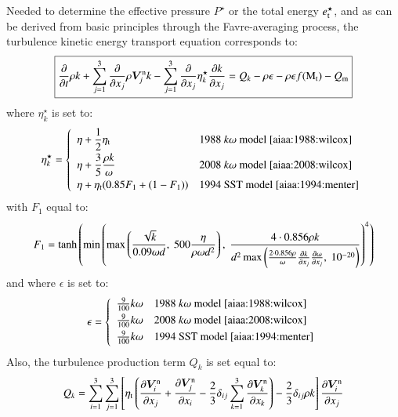 \documentclass{warpdoc}
\newcommand\frameeqn[1]{\fbox{$\displaystyle #1$}}
\newcommand{\alb}{\vspace{0.1cm}\\} %
\newcommand{\mfd}{\displaystyle}
\newcommand{\visc}{\eta}
\renewcommand{\vec}[1]{\bm{#1}}
\begin{document}
Needed to determine the effective pressure $P^\star$ or the total energy $e_{\rm t}^\star$, and as can be derived from basic principles through the Favre-averaging process, the turbulence kinetic energy transport equation corresponds to:
%
\begin{equation}
\frameeqn{
    \frac{\partial }{\partial t} \rho k
  + \sum_{j=1}^{3}\frac{\partial }{\partial x_j} \rho \vec{V}^{\rm n}_j k
  - \sum_{j=1}^{3} \frac{\partial }{\partial x_j}
     \visc_k^\star \frac{\partial k}{\partial x_j}
  =
  Q_k-\rho \epsilon -\rho\epsilon f({\rm M}_{\rm t})-Q_{\rm m}
}
\label{eqn:k}
\end{equation}
%
where $\visc_k^\star$ is set to:
%
\begin{equation}
\visc_k^\star = \left\{\begin{array}{ll}\mfd\visc  + \frac{1}{2}\visc_{\rm t} & \textrm{1988~$k\omega$~model \cite{aiaa:1988:wilcox}} \alb
                                      \mfd \visc  +  \frac{3}{5} \frac{\rho k}{\omega} & \textrm{2008~$k\omega$~model \cite{aiaa:2008:wilcox}}  \alb
                                      \mfd \visc + \visc_{\rm t} (0.85 F_1+(1-F_1))  & \textrm{1994 SST model \cite{aiaa:1994:menter}}
                                      \end{array} \right.
\end{equation}
%
with $F_1$ equal to:
%
\begin{equation}
F_1= {\rm tanh} \left(
  \min \left(
  \max \left(
  \frac{\sqrt{k}}{0.09 \omega d}, ~500 \frac{\visc}{\rho \omega  d^2}
   \right),~
   \frac{4\cdot 0.856 \rho k}{d^2 \max\left(\frac{2\cdot 0.856 \rho }{\omega} \frac{\partial k}{\partial x_j}\frac{\partial \omega}{\partial x_j}  ,~10^{-20} \right)}
   \right)^4
   \right)
\end{equation}
%
and where $\epsilon$ is set to:
%
\begin{equation}
\epsilon= \left\{\begin{array}{ll}
                    \frac{9}{100} k\omega & \textrm{1988~$k\omega$~model \cite{aiaa:1988:wilcox}} \alb
                    \frac{9}{100} k \omega & \textrm{2008~$k\omega$~model \cite{aiaa:2008:wilcox}} \alb
                    \frac{9}{100} k \omega & \textrm{1994 SST model \cite{aiaa:1994:menter}} \alb
                 \end{array} \right.
\end{equation}
%
Also, the turbulence production term $Q_k$ is set equal to:
%
\begin{equation}
  Q_k= \mfd\sum_{i=1}^3 \sum_{j=1}^{3}
         \left[ \visc_{\rm t} \left(
           \frac{\partial {\vec{V}^{\rm n}_i}}{\partial x_j}
           +\frac{\partial {\vec{V}^{\rm n}_j}}{\partial x_i}
           -\frac{2}{3} \delta_{ij} \sum_{k=1}^3 \frac{\partial {\vec{V}^{\rm n}_k}}{\partial x_k}
            \right)
           - \frac{2}{3} \delta_{ij} {\rho} k
         \right]
         \frac{\partial {\vec{V}^{\rm n}_i}}{\partial x_j}
\label{eqn:Pk}
\end{equation}
\end{document}
